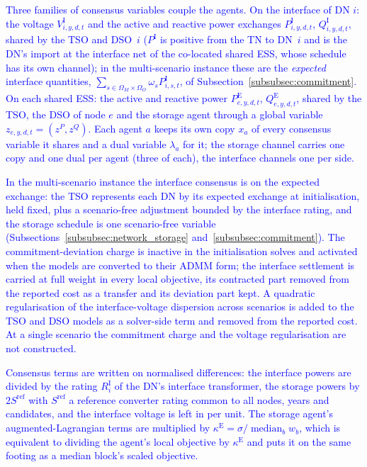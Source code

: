 \documentclass[preprint,12pt]{elsarticle}
\begin{document}
\textcolor{blue}{
    Three families of consensus variables couple the agents. On the interface of DN $i$: the voltage $V^{\text{I}}_{i,y,d,t}$ and the active and reactive power exchanges $P^{\text{I}}_{i,y,d,t}$, $Q^{\text{I}}_{i,y,d,t}$, shared by the TSO and DSO~$i$ ($P^{\text{I}}$ is positive from the TN to DN~$i$ and is the DN's import at the interface net of the co-located shared ESS, whose schedule has its own channel); in the multi-scenario instance these are the \emph{expected} interface quantities, $\sum_{s \in \Omega_M \times \Omega_O} \omega_s P^{\text{I}}_{i,s,t}$, of Subsection~\ref{subsubsec:commitment}. On each shared ESS: the active and reactive power $P^{\text{E}}_{e,y,d,t}$, $Q^{\text{E}}_{e,y,d,t}$, shared by the TSO, the DSO of node $e$ and the storage agent through a global variable $z_{e,y,d,t} = (z^{P}, z^{Q})$. Each agent $a$ keeps its own copy $x_a$ of every consensus variable it shares and a dual variable $\lambda_a$ for it; the storage channel carries one copy and one dual per agent (three of each), the interface channels one per side.
}

\textcolor{blue}{
    In the multi-scenario instance the interface consensus is on the expected exchange: the TSO represents each DN by its expected exchange at initialisation, held fixed, plus a scenario-free adjustment bounded by the interface rating, and the storage schedule is one scenario-free variable (Subsections~\ref{subsubsec:network_storage} and~\ref{subsubsec:commitment}). The commitment-deviation charge is inactive in the initialisation solves and activated when the models are converted to their ADMM form; the interface settlement is carried at full weight in every local objective, its contracted part removed from the reported cost as a transfer and its deviation part kept. A quadratic regularisation of the interface-voltage dispersion across scenarios is added to the TSO and DSO models as a solver-side term and removed from the reported cost. At a single scenario the commitment charge and the voltage regularisation are not constructed.
}

\textcolor{blue}{
    Consensus terms are written on normalised differences: the interface powers are divided by the rating $R^{\text{I}}_i$ of the DN's interface transformer, the storage powers by $2 S^{\text{ref}}$ with $S^{\text{ref}}$ a reference converter rating common to all nodes, years and candidates, and the interface voltage is left in per unit.
    The storage agent's augmented-Lagrangian terms are multiplied by $\kappa^{\text{E}} = \sigma / \operatorname{median}_b w_b$, which is equivalent to dividing the agent's local objective by $\kappa^{\text{E}}$ and puts it on the same footing as a median block's scaled objective.
}
\end{document}
